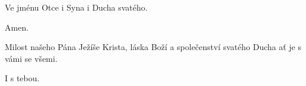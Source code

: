 \mbox{}

Ve jménu Otce i Syna \grealtcross{} i Ducha svatého.

\Rbardot{} Amen.
	   	
\Vbardot{} Milost našeho Pána Ježíše Krista, láska Boží a společenství svatého Ducha ať
je s vámi se všemi.

\Rbardot{} I s tebou.
